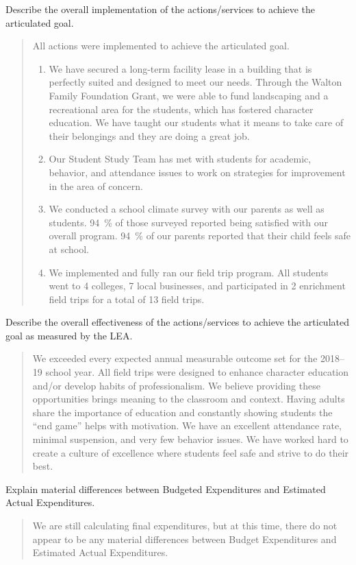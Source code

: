 \documentclass{article}
\newcounter{goal}[section] %
\newcounter{action}[goal]
\newenvironment{actionanalysis}
	{
		\begin{enumerate}[label={\bf Action \theenumi:}]
	}
	{
		\end{enumerate}
	}
\begin{document}
Describe the overall implementation of the actions/services to achieve the articulated goal.
\begin{quotation}
	All actions were implemented to achieve the articulated goal.
	\begin{actionanalysis}
	\item We have secured a long-term facility lease in a building that is perfectly suited and designed to meet our needs. Through the Walton Family Foundation Grant, we were able to fund landscaping and a recreational area for the students, which has fostered character education. We have taught our students what it means to take care of their belongings and they are doing a great job.
	\item Our Student Study Team has met with students for academic, behavior, and attendance issues to work on strategies for improvement in the area of concern.
	\item We conducted a school climate survey with our parents as well as students. \SI{94}{\percent} of those surveyed reported being satisfied with our overall program. \SI{94}{\percent} of our parents reported that their child feels safe at school.
	\item We implemented and fully ran our field trip program. All students went to 4 colleges, 7 local businesses, and participated in 2 enrichment field trips for a total of 13 field trips.
	\end{actionanalysis}
\end{quotation}

Describe the overall effectiveness of the actions/services to achieve the articulated goal as measured by the LEA.
\begin{quotation}
	We exceeded every expected annual measurable outcome set for the 2018--19 school year. All field trips were designed to enhance character education and/or develop habits of professionalism. We believe providing these opportunities brings meaning to the classroom and context. Having adults share the importance of education and constantly showing students the ``end game'' helps with motivation. We have an excellent attendance rate, minimal suspension, and very few behavior issues. We have worked hard to create a culture of excellence where students feel safe and strive to do their best.
\end{quotation}

Explain material differences between Budgeted Expenditures and Estimated Actual Expenditures.
\begin{quotation}
	We are still calculating final expenditures, but at this time, there do not appear to be any material differences between Budget Expenditures and Estimated Actual Expenditures.
\end{quotation}
\end{document}
